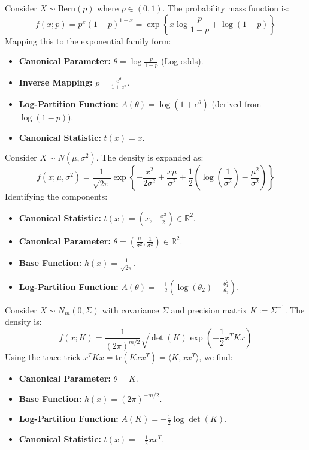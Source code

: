 \begin{eg}
    Consider $X \sim \text{Bern}(p)$ where $p \in (0, 1)$. The probability mass function is:
\begin{equation*}
    f(x;p) = p^x (1-p)^{1-x} = \exp\left\{ x \log \frac{p}{1-p} + \log(1-p) \right\}
\end{equation*}
Mapping this to the exponential family form:
\begin{itemize}
    \item \textbf{Canonical Parameter:} $\theta = \log \frac{p}{1-p}$ (Log-odds).
    \item \textbf{Inverse Mapping:} $p = \frac{e^{\theta}}{1+e^{\theta}}$.
    \item \textbf{Log-Partition Function:} $A(\theta) = \log(1+e^{\theta})$ (derived from $\log(1-p)$).
    \item \textbf{Canonical Statistic:} $t(x) = x$.
\end{itemize}
\end{eg}


\begin{eg}
    Consider $X \sim N(\mu, \sigma^2)$. The density is expanded as:
\begin{equation*}
    f(x; \mu, \sigma^2) = \frac{1}{\sqrt{2\pi}} \exp\left\{ -\frac{x^2}{2\sigma^2} + \frac{x\mu}{\sigma^2} + \frac{1}{2}\left( \log\left(\frac{1}{\sigma^2}\right) - \frac{\mu^2}{\sigma^2} \right) \right\}
\end{equation*}
Identifying the components:
\begin{itemize}
    \item \textbf{Canonical Statistic:} $t(x) = (x, -\frac{x^2}{2}) \in \mathbb{R}^2$.
    \item \textbf{Canonical Parameter:} $\theta = (\frac{\mu}{\sigma^2}, \frac{1}{\sigma^2}) \in \mathbb{R}^2$.
    \item \textbf{Base Function:} $h(x) = \frac{1}{\sqrt{2\pi}}$.
    \item \textbf{Log-Partition Function:} $A(\theta) = -\frac{1}{2} (\log(\theta_2) - \frac{\theta_1^2}{\theta_2})$.
\end{itemize}
\end{eg}
\begin{eg}
    Consider $X \sim N_m(0, \Sigma)$ with covariance $\Sigma$ and precision matrix $K := \Sigma^{-1}$. The density is:
\begin{equation*}
    f(x; K) = \frac{1}{(2\pi)^{m/2}} \sqrt{\det(K)} \exp\left( -\frac{1}{2} x^T K x \right)
\end{equation*}
Using the trace trick $x^T K x = \text{tr}(K x x^T) = \langle K, x x^T \rangle$, we find:
\begin{itemize}
    \item \textbf{Canonical Parameter:} $\theta = K$.
    \item \textbf{Base Function:} $h(x) = (2\pi)^{-m/2}$.
    \item \textbf{Log-Partition Function:} $A(K) = -\frac{1}{2} \log \det(K)$.
    \item \textbf{Canonical Statistic:} $t(x) = -\frac{1}{2} xx^T$.
\end{itemize}
\end{eg}

